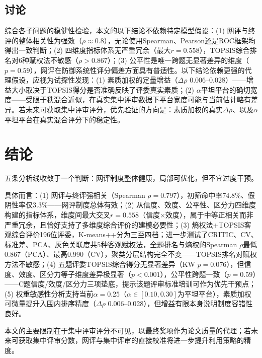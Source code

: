 \documentclass[UTF8,12pt]{ctexart}
\begin{document}
\subsection{讨论}

综合各子问题的稳健性检验，本文的以下结论不依赖特定模型假设：(1) 网评与终评的整体相关性为强效（$\rho\approx0.8$），无论使用Spearman、Pearson还是ROC框架均得出一致判断；(2) 四维度指标体系无严重冗余（最大$r=0.558$），TOPSIS综合排名对6种赋权法不敏感（$\rho>0.867$）；(3) 公平性是唯一跨题无显著差异的维度（$p=0.59$），网评在防御系统性评分偏差方面具有普适性。以下结论依赖更强的代理假设，应视为试探性发现：(1) 素质加权的定量增益（$\Delta\rho$ 0.006--0.028）——增益大小取决于TOPSIS得分是否准确反映了评委真实素质；(2) $\alpha$平坦平台的确切宽度——受限于秩混合近似，在真实集中评审数据下平台宽度可能与当前估计略有差异。若未来可获取集中评审评分，优先验证的方向是：素质加权的真实$\Delta\rho$、以及$\alpha$平坦平台在真实混合评分下的稳定性。

\section{结论}

五条分析线收敛于一个判断：网评制度整体健康，局部可优化，但不宜过度干预。

具体而言：(1) 网评与终评强相关（Spearman $\rho=0.797$），初筛命中率74.8\%、假阴性率仅3.3\%——网评制度总体有效；(2) 从信度、效度、公平性、区分力四维度构建的指标体系，维度间最大交叉$r=0.558$（信度$\times$效度），属于中等正相关而非严重冗余，且恰好支持了多维度综合评价的建模必要性；(3) 熵权法+TOPSIS客观综合评价196位评委，K-means++分为三至四档；进一步测试了CRITIC、CV、标准差、PCA、灰色关联度共5种客观赋权法，全题排名与熵权的Spearman $\rho$最低0.867（PCA）、最高0.990（CV），聚类分层结构完全不变——TOPSIS排名对赋权方法不敏感；(4) 五题评委TOPSIS综合得分无显著差异（KW $p=0.076$），但信度、效度、区分力等子维度差异极显著（$p<0.001$），公平性跨题一致（$p=0.59$）——C题信度/效度/区分力三项垫底，提示该题评审标准培训可作为优先干预点；(5) 权重敏感性分析支持当前$\alpha=0.25$（$\alpha\in[0.10,0.30]$为平坦平台），素质加权可微量提升入围内排序精度（$\Delta\rho$ 0.006--0.028），但增益有限本身说明制度容错性良好。

本文的主要限制在于集中评审评分不可见，以最终奖项作为论文质量的代理；若未来可获取集中评审分数，网评与集中评审的直接校准将进一步提升利用策略的精度。
\end{document}
